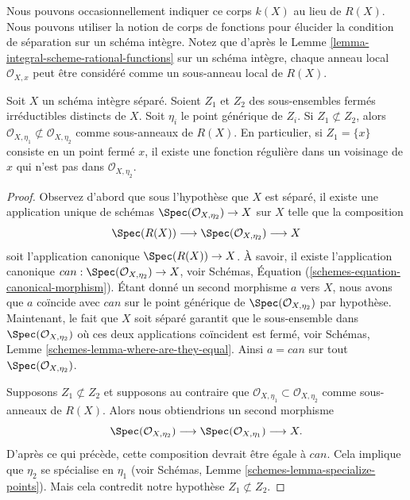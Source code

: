 \noindent
Nous pouvons occasionnellement indiquer ce corps $k(X)$ au lieu de
$R(X)$. Nous pouvons utiliser la notion de corps de fonctions
pour élucider la condition de séparation sur
un schéma intègre. Notez que d'après le Lemme \ref{lemma-integral-scheme-rational-functions} sur un schéma
intègre, chaque anneau local $\mathcal{O}_{X, x}$ peut être considéré comme un sous-anneau
local de $R(X)$.

\begin{lemma}
\label{lemma-distinct-local-rings}
Soit $X$ un schéma intègre séparé.
Soient $Z_1$ et $Z_2$ des sous-ensembles fermés irréductibles
distincts de $X$. Soit
$\eta_i$ le point générique
de $Z_i$. Si $Z_1 \not\subset Z_2$, alors $\mathcal{O}_{X, \eta_1} \not \subset \mathcal{O}_{X, \eta_2}$ comme sous-anneaux
de $R(X)$. En
particulier, si $Z_1 = \{x\}$ consiste en un point fermé $x$,
il existe une fonction régulière dans un voisinage de
$x$ qui n'est pas dans $\mathcal{O}_{X, \eta_{2}}$.
\end{lemma}

\begin{proof}
Observez d'abord que sous l'hypothèse que $X$ est séparé,
il existe une application unique
de schémas $\Spec(\mathcal{O}_{X, \eta_2}) \to X$ sur $X$ telle
que la composition
$$
\Spec(R(X)) \longrightarrow
\Spec(\mathcal{O}_{X, \eta_2}) \longrightarrow X
$$
soit l'application canonique $\Spec(R(X)) \to X$.
À savoir, il existe l'application
canonique $can : \Spec(\mathcal{O}_{X, \eta_2}) \to X$, voir Schémas,
Équation (\ref{schemes-equation-canonical-morphism}). Étant donné un second morphisme $a$
vers $X$, nous avons que $a$ coïncide
avec $can$ sur le
point générique de $\Spec(\mathcal{O}_{X, \eta_2})$ par hypothèse.
Maintenant, le fait que $X$ soit séparé
garantit que le sous-ensemble
dans $\Spec(\mathcal{O}_{X, \eta_2})$ où ces deux applications
coïncident est fermé, voir Schémas, Lemme
\ref{schemes-lemma-where-are-they-equal}. Ainsi $a = can$ sur tout $\Spec(\mathcal{O}_{X, \eta_2})$.

\medskip\noindent
Supposons $Z_1 \not \subset Z_2$ et supposons au contraire
que $\mathcal{O}_{X, \eta_{1}} \subset \mathcal{O}_{X, \eta_{2}}$ comme sous-anneaux de $R(X)$.
Alors nous obtiendrions un second morphisme
$$
\Spec(\mathcal{O}_{X, \eta_{2}}) \longrightarrow
\Spec(\mathcal{O}_{X, \eta_{1}}) \longrightarrow
X.
$$
D'après ce qui précède, cette composition devrait être égale
à $can$. Cela implique que $\eta_2$ se spécialise
en $\eta_1$ (voir Schémas, Lemme \ref{schemes-lemma-specialize-points}).
Mais cela contredit notre hypothèse $Z_1 \not \subset Z_2$.
\end{proof}

